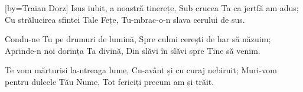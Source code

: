 [by={Traian Dorz}]
\beginverse
Isus iubit, a noastră tinerețe,
Sub crucea Ta ca jertfă am adus;
Cu strălucirea sfintei Tale Fețe,
Tu-mbrac-o-n slava cerului de sus.
\endverse

\beginverse
Condu-ne Tu pe drumuri de lumină,
Spre culmi cerești de har să năzuim;
Aprinde-n noi dorința Ta divină,
Din slăvi în slăvi spre Tine să venim.
\endverse

\beginverse
Te vom mărturisi la-ntreaga lume,
Cu-avânt și cu curaj nebiruit;
Muri-vom pentru dulcele Tău Nume,
Tot fericiți precum am și trăit.
\endverse
\endsong